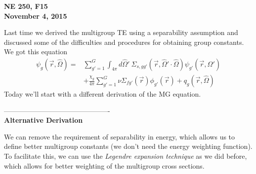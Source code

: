 \documentclass[12pt]{article}
\newcommand{\vecr}{\ensuremath{\vec{r}}}
\newcommand{\vOmega}{\ensuremath{\hat{\Omega}}}
\begin{document}
\begin{center}
{\bf NE 250, F15\\
November 4, 2015 
}
\end{center}

Last time we derived the multigroup TE using a separability assumption and discussed some of the difficulties and procedures for obtaining group constants. We got this equation
\begin{align*}
[\vOmega \cdot \nabla + \Sigma_{tg}(\vec{r})]\psi_g(\vec{r}, \vOmega) =&  \sum_{g'=1}^G \int_{4 \pi} d\vOmega'\: \Sigma_{s,gg'}(\vecr, \vOmega' \cdot \vOmega) \psi_{g'}(\vec{r}, \vOmega')\\
&+\frac{\chi_g}{4 \pi}\sum_{g'=1}^G \nu\Sigma_{fg'}(\vec{r}) \phi_{g'}(\vec{r}) + q_g(\vec{r}, \vOmega)
\end{align*}
Today we'll start with a different derivation of the MG equation.

----------------------------------------------\\
\textbf{Alternative Derivation} 

We can remove the requirement of separability in energy, which allows us to define better multigroup constants (we don't need the energy weighting function). \\
To facilitate this, we can use the \textit{Legendre expansion technique} as we did before, which allows for better weighting of the multigroup cross sections.
\end{document}
